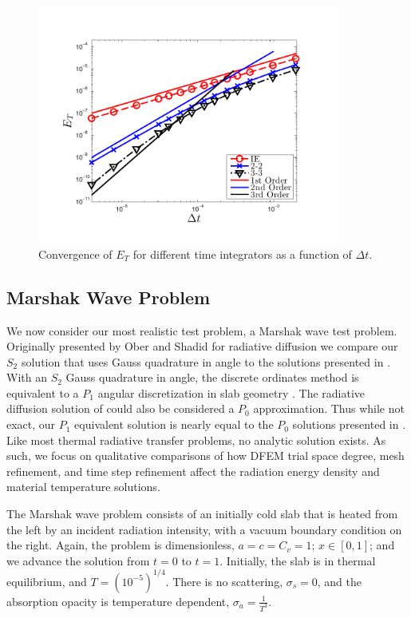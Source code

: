 \begin{figure}[!htp]
\centering
\includegraphics[width=10cm,trim=0.25in  0.2in 0.75in 0.5in,clip=true]{chapter6_grey_radtran/Dissertation_Data/Time_Integrators_Convergence_Temperature.pdf}
\caption{Convergence of $E_{T}$ for different time integrators as a function of $\Delta t$.}
\label{fig:big_dt}
\end{figure}

\subsection{Marshak Wave Problem}

We now consider our most realistic test problem, a Marshak wave test problem.
Originally presented by Ober and Shadid for radiative diffusion \cite{ober_shadid} we compare our $S_2$ solution that uses Gauss quadrature in angle to the solutions presented in \cite{ober_shadid}.
With an $S_2$ Gauss quadrature in angle, the discrete ordinates method is equivalent to a $P_1$ angular discretization in slab geometry \cite{s2sa}.
The radiative diffusion solution of \cite{ober_shadid} could also be considered a $P_0$ approximation.
Thus while not exact, our $P_1$ equivalent solution is nearly equal to the $P_0$ solutions presented in \cite{ober_shadid}.
Like most thermal radiative transfer problems, no analytic solution exists.  
As such, we focus on qualitative comparisons of how DFEM trial space degree, mesh refinement, and time step refinement affect the radiation energy density and material temperature solutions.

The Marshak wave problem consists of an initially cold slab that is heated from the left by an incident radiation intensity, with a vacuum boundary condition on the right.
Again, the problem is dimensionless, $a=c=C_v=1$; $x\in[0,1]$; and we advance the solution from $t=0$ to $t=1$.
Initially, the slab is in thermal equilibrium, and $T=\left( 10^{-5} \right)^{1/4}$.
There is no scattering, $\sigma_s = 0$, and the absorption opacity is temperature dependent, $\sigma_a = \frac{1}{T^3}$.

